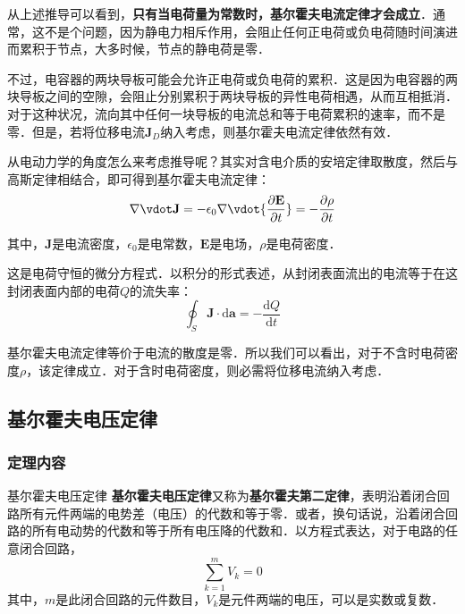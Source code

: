 从上述推导可以看到，\textbf{只有当电荷量为常数时，基尔霍夫电流定律才会成立}．通常，这不是个问题，因为静电力相斥作用，会阻止任何正电荷或负电荷随时间演进而累积于节点，大多时候，节点的静电荷是零．

不过，电容器的两块导板可能会允许正电荷或负电荷的累积．这是因为电容器的两块导板之间的空隙，会阻止分别累积于两块导板的异性电荷相遇，从而互相抵消．对于这种状况，流向其中任何一块导板的电流总和等于电荷累积的速率，而不是零．但是，若将位移电流$\mathbf{J}_D$纳入考虑，则基尔霍夫电流定律依然有效．

从电动力学的角度怎么来考虑推导呢？其实对含电介质的安培定律取散度，然后与高斯定律相结合，即可得到基尔霍夫电流定律：
\begin{equation}
\nabla \vdot \mathbf {J} =-\epsilon _{0}\nabla \vdot {\frac {\partial \mathbf {E} }{\partial t}}=-{\frac {\partial \rho }{\partial t}}
\end{equation}
 
其中，$\mathbf{J}$是电流密度，$\epsilon_0$是电常数，$\mathbf{E}$是电场，$\rho$是电荷密度．

这是电荷守恒的微分方程式．以积分的形式表述，从封闭表面流出的电流等于在这封闭表面内部的电荷$Q$的流失率：
\begin{equation}
\oint _{S}\mathbf {J} \cdot \mathrm {d} \mathbf {a} =-{\frac {\mathrm {d} Q}{\mathrm {d} t}}
\end{equation}

基尔霍夫电流定律等价于电流的散度是零．所以我们可以看出，对于不含时电荷密度$\rho$，该定律成立．对于含时电荷密度，则必需将位移电流纳入考虑．

\subsection{基尔霍夫电压定律}
\subsubsection{定理内容}
\begin{theorem}{基尔霍夫电压定律}
\textbf{基尔霍夫电压定律}又称为\textbf{基尔霍夫第二定律}，表明沿着闭合回路所有元件两端的电势差（电压）的代数和等于零．或者，换句话说，沿着闭合回路的所有电动势的代数和等于所有电压降的代数和．以方程式表达，对于电路的任意闭合回路，
\begin{equation}
\sum_{k=1}^m V_k = 0
\end{equation}
其中，$m$是此闭合回路的元件数目，$V_k$是元件两端的电压，可以是实数或复数．
\end{theorem}

